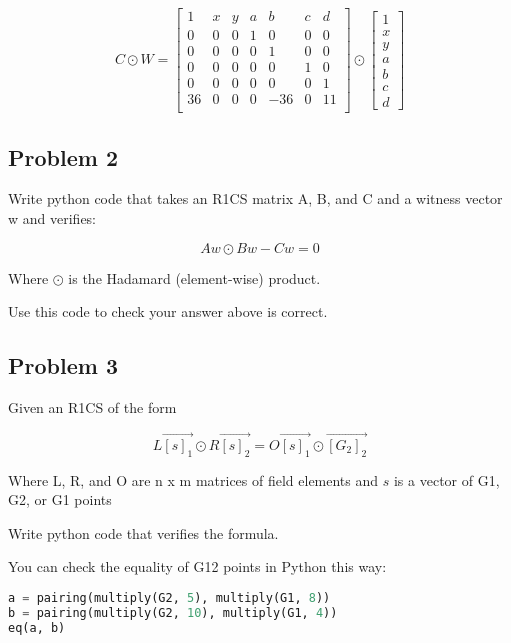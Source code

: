 \documentclass{article}
\begin{document}
\[
C \odot W = \begin{bmatrix}
    1 & x & y & a & b & c & d\\
    0 & 0 & 0 & 1 & 0 & 0 & 0\\
    0 & 0 & 0 & 0 & 1 & 0 & 0\\
    0 & 0 & 0 & 0 & 0 & 1 & 0\\
    0 & 0 & 0 & 0 & 0 & 0 & 1\\
    36 & 0 & 0 & 0 & -36 & 0 & 11\\
\end{bmatrix} \odot \begin{bmatrix}
    1 \\ x \\ y \\ a \\ b \\ c \\ d
\end{bmatrix}
\]

\subsection*{Problem 2}

Write python code that takes an R1CS matrix A, B, and C and a witness vector w and verifies:

\[Aw \odot Bw - Cw = 0\]

Where $\odot$ is the Hadamard (element-wise) product.

Use this code to check your answer above is correct.

\subsection*{Problem 3}

Given an R1CS of the form

\[L\vec{[s]_1} \odot R\vec{[s]_2} = O\vec{[s]_1} \odot \vec{[G_2]_2}\]

Where L, R, and O are n x m matrices of field elements and $s$ is a vector of G1, G2, or G1 points

Write python code that verifies the formula.

You can check the equality of G12 points in Python this way:

\begin{lstlisting}[language=Python]
a = pairing(multiply(G2, 5), multiply(G1, 8))
b = pairing(multiply(G2, 10), multiply(G1, 4))
eq(a, b)
\end{lstlisting}
\end{document}
